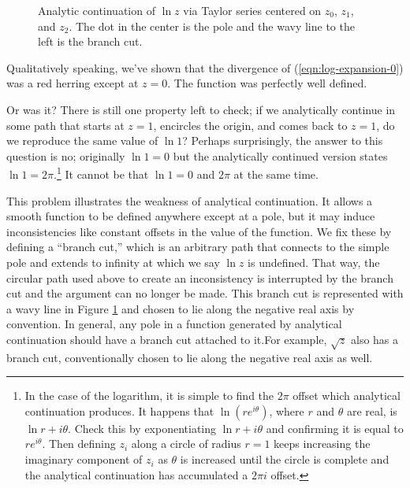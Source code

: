 \begin{figure}
  \centering
  \caption{Analytic continuation of $\ln z$ via Taylor series centered on $z_0$, $z_1$, and $z_2$. The dot in the center is the pole and the wavy line to the left is the branch cut.}
  \label{fig:ln-analytic-continuation}
\end{figure}

Qualitatively speaking, we've shown that the divergence of (\ref{eqn:log-expansion-0}) was a red herring except at $z=0$. The function was perfectly well defined.

Or was it? There is still one property left to check; if we analytically continue in some path that starts at $z=1$, encircles the origin, and comes back to $z=1$, do we reproduce the same value of $\ln 1$? Perhaps surprisingly, the answer to this question is no; originally $\ln 1 = 0$ but the analytically continued version states $\ln 1 = 2\pi$.\footnote{In the case of the logarithm, it is simple to find the $2\pi$ offset which analytical continuation produces. It happens that $\ln(re^{i\theta})$, where $r$ and $\theta$ are real, is $\ln r + i\theta$. Check this by exponentiating $\ln r + i\theta$ and confirming it is equal to $re^{i\theta}$. Then defining $z_i$ along a circle of radius $r=1$ keeps increasing the imaginary component of $z_i$ as $\theta$ is increased until the circle is complete and the analytical continuation has accumulated a $2\pi i$ offset.} It cannot be that $\ln 1 = 0$ and $2\pi$ at the same time.

This problem illustrates the weakness of analytical continuation. It allows a smooth function to be defined anywhere except at a pole, but it may induce inconsistencies like constant offsets in the value of the function. We fix these by defining a ``branch cut,'' which is an arbitrary path that connects to the simple pole and extends to infinity at which we say $\ln z$ is undefined. That way, the circular path used above to create an inconsistency is interrupted by the branch cut and the argument can no longer be made. This branch cut is represented with a wavy line in Figure \ref{fig:ln-analytic-continuation} and chosen to lie along the negative real axis by convention. In general, any pole in a function generated by analytical continuation should have a branch cut attached to it.For example, $\sqrt{z}$ also has a branch cut, conventionally chosen to lie along the negative real axis as well.

